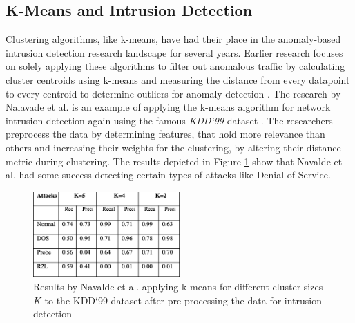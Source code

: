 \subsection{K-Means and Intrusion Detection}
\label{subsec:k_means_intrusion_detection}
Clustering algorithms, like k-means, have had their place in the anomaly-based intrusion detection research landscape for several years. Earlier research focuses on solely applying these algorithms to filter out anomalous traffic by calculating cluster centroids using k-means and measuring the distance from every datapoint to every centroid to determine outliers for anomaly detection \cite{munz2007traffic}. The research by Nalavade et al. \cite{nalavade2014} is an example of applying the k-means algorithm for network intrusion detection again using the famous \emph{KDD`99} dataset \cite{kdd1999}. The researchers preprocess the data by determining features, that hold more relevance than others and increasing their weights for the clustering, by altering their distance metric during clustering. The results depicted in Figure \ref{fig:k_means_navalde} show that Navalde et al. had some success detecting certain types of attacks like Denial of Service. 

\begin{figure}[H]
	\sffamily\footnotesize
	\includegraphics[width=0.5\textwidth]{pic/navalde_k_means.png}
	\unitlength=0.75mm
	\linethickness{0.4pt}
	\caption{Results by Navalde et al. applying k-means for different cluster sizes $K$ to the KDD`99 dataset after pre-processing the data for intrusion detection \cite{nalavade2014}}
	\label{fig:k_means_navalde}
\end{figure}


